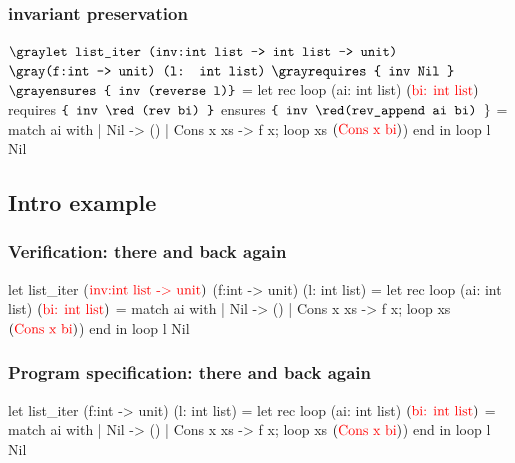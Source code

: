 \begin{frame}[fragile]
\frametitle{invariant preservation}
\begin{footnotesize}
\begin{whycode}
${\gray\texttt{let list\_iter (inv:int list -> int list -> unit)}}$ 
    ${\gray\texttt{(f:int -> unit) (l: int list)}}$
     ${\gray\texttt{requires \{ inv Nil \}}}$
     ${\gray\texttt{ensures \{ inv (reverse l)\}}}$    
 = let rec loop (ai: int list) $(\textcolor{red}{\text{bi: int list}})$
      requires  $\texttt{\{  inv {\red (rev bi)} \}}$
      ensures   $\texttt{\{  inv {\red(rev\_append ai bi)} }\}$  
    = match ai with 
       | Nil       -> ()
       | Cons x xs -> f x; loop xs $(\textcolor{red}{\text{Cons x bi}})$) end
   in loop l Nil
\end{whycode}
\end{footnotesize}
\end{frame}

\subsection*{Intro example}
\begin{frame}[fragile]
\frametitle{Verification: there and back again}
\begin{footnotesize}
\begin{whycode}
let list_iter ($\textcolor{red}{\text{inv:int list -> unit}})$ 
    (f:int -> unit) (l: int list)
 = let rec loop (ai: int list) $(\textcolor{red}{\text{bi: int list}})$
    = match ai with 
       | Nil       -> ()
       | Cons x xs -> f x; loop xs $(\textcolor{red}{\text{Cons x bi}})$) end
   in loop l Nil
\end{whycode}
\end{footnotesize}
\end{frame}
\addtocounter{framenumber}{-1}


\begin{frame}[fragile]
\frametitle{Program specification: there and back again}
\begin{footnotesize}
\begin{whycode}
let list_iter (f:int -> unit) (l: int list)
 = let rec loop (ai: int list) $(\textcolor{red}{\text{bi: int list}})$
    = match ai with 
       | Nil       -> ()
       | Cons x xs -> f x; loop xs $(\textcolor{red}{\text{Cons x bi}})$) end
   in loop l Nil
\end{whycode}
\end{footnotesize}
\end{frame}
\addtocounter{framenumber}{-1}

